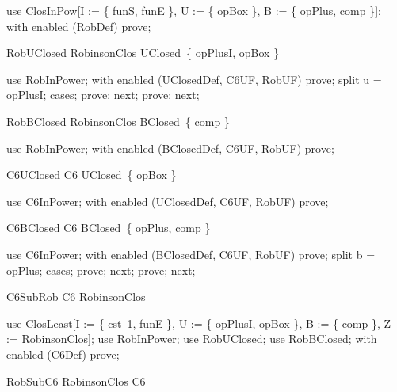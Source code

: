 \documentclass{article}
\begin{document}
\begin{zproof}
use ClosInPow[I := \{ funS, funE \}, U := \{ opBox \}, B := \{ opPlus, comp \}];
with enabled (RobDef) prove;
\end{zproof}

\begin{theorem}{RobUClosed}
  RobinsonClos \in UClosed~\{ opPlusI, opBox \}
\end{theorem}

\begin{zproof}
use RobInPower;
with enabled (UClosedDef, C6UF, RobUF) prove;
split u = opPlusI;
cases;
prove;
next;
prove;
next;
\end{zproof}

\begin{theorem}{RobBClosed}
  RobinsonClos \in BClosed~\{ comp \}
\end{theorem}

\begin{zproof}
use RobInPower;
with enabled (BClosedDef, C6UF, RobUF) prove;
\end{zproof}

\begin{theorem}{C6UClosed}
  C6 \in UClosed~\{ opBox \}
\end{theorem}

\begin{zproof}
use C6InPower;
with enabled (UClosedDef, C6UF, RobUF) prove;
\end{zproof}

\begin{theorem}{C6BClosed}
  C6 \in BClosed~\{ opPlus, comp \}
\end{theorem}

\begin{zproof}
use C6InPower;
with enabled (BClosedDef, C6UF, RobUF) prove;
split b = opPlus;
cases;
prove;
next;
prove;
next;
\end{zproof}

\begin{theorem}{C6SubRob}
  C6 \subseteq RobinsonClos
\end{theorem}

\begin{zproof}
use ClosLeast[I := \{ cst~1, funE \}, U := \{ opPlusI, opBox \}, B := \{ comp \}, Z := RobinsonClos];
use RobInPower;
use RobUClosed;
use RobBClosed;
with enabled (C6Def) prove;
\end{zproof}

\begin{theorem}{RobSubC6}
  RobinsonClos \subseteq C6
\end{theorem}
\end{document}
